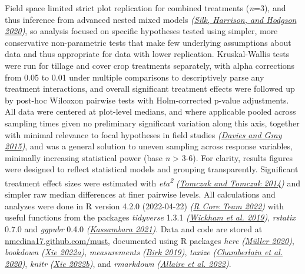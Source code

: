 \documentclass[
]{article}
\begin{document}
Field space limited strict plot replication for combined treatments (\emph{n}=3), and thus inference from advanced nested mixed models \emph{(\protect\hyperlink{ref-silk20}{Silk, Harrison, and Hodgson 2020})}, so analysis focused on specific hypotheses tested using simpler, more conservative non-parametric tests that make few underlying assumptions about data and thus appropriate for data with lower replication.
Kruskal-Wallis tests were run for tillage and cover crop treatments separately, with alpha corrections from 0.05 to 0.01 under multiple comparisons to descriptively parse any treatment interactions, and overall significant treatment effects were followed up by post-hoc Wilcoxon pairwise tests with Holm-corrected p-value adjustments.
All data were centered at plot-level medians, and where applicable pooled across sampling times given no preliminary significant variation along this axis, together with minimal relevance to focal hypotheses in field studies \emph{(\protect\hyperlink{ref-davies15b}{Davies and Gray 2015})}, and was a general solution to uneven sampling across response variables, minimally increasing statistical power (base \emph{n} \textgreater{} 3-6).
For clarity, results figures were designed to reflect statistical models and grouping transparently.
Significant treatment effect sizes were estimated with \emph{eta\textsuperscript{2}} \emph{(\protect\hyperlink{ref-tomczak14}{Tomczak and Tomczak 2014})} and simpler raw median differences at finer pairwise levels.
All calculations and analyzes were done in R version 4.2.0 (2022-04-22) \emph{(\protect\hyperlink{ref-base}{R Core Team 2022})} with useful functions from the packages \emph{tidyverse} 1.3.1 \emph{(\protect\hyperlink{ref-tidyverse}{Wickham et al. 2019})}, \emph{rstatix} 0.7.0 and \emph{ggpubr} 0.4.0 \emph{(\protect\hyperlink{ref-rstatix}{Kassambara 2021})}.
Data and code are stored at \url{nmedina17.github.com/must},
documented using R packages \emph{here} \emph{(\protect\hyperlink{ref-here}{Müller 2020})}, \emph{bookdown} \emph{(\protect\hyperlink{ref-bookdown2022}{Xie 2022a})}, \emph{measurements} \emph{(\protect\hyperlink{ref-measurements}{Birk 2019})}, \emph{taxize} \emph{(\protect\hyperlink{ref-taxize2020}{Chamberlain et al. 2020})}, \emph{knitr} \emph{(\protect\hyperlink{ref-knitr2022}{Xie 2022b})}, and \emph{rmarkdown} \emph{(\protect\hyperlink{ref-rmarkdown2022}{Allaire et al. 2022})}.
\end{document}
